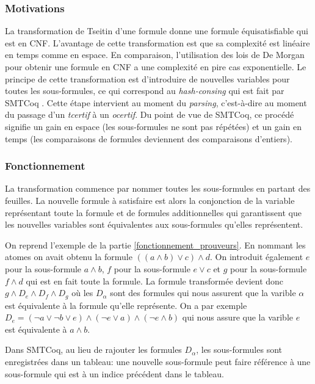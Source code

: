 \documentclass[11pt]{article}
\begin{document}
\subsubsection{Motivations}

La transformation de Tseitin d'une formule donne une formule équisatisfiable qui est en CNF. L'avan\-tage de cette transformation est que sa complexité est linéaire en temps comme en espace. En comparaison, l'utilisation des lois de De Morgan pour obtenir une formule en CNF a une complexité en pire cas exponentielle. Le principe de cette transformation est d'introduire de nouvelles variables pour toutes les sous-formules, ce qui correspond au \textit{hash-consing} qui est fait par SMTCoq \cite{smtcoq_code}. Cette étape intervient au moment du \textit{parsing}, c'est-à-dire au moment du passage d'un \textit{tcertif} à un \textit{ocertif}. Du point de vue de SMTCoq, ce procédé signifie un gain en espace (les sous-formules ne sont pas répétées) et un gain en temps (les comparaisons de formules deviennent des comparaisons d'entiers).


\subsubsection{Fonctionnement}

La transformation commence par nommer toutes les sous-formules en partant des feuilles. La nouvelle formule à satisfaire est alors la conjonction de la variable représentant toute la formule et de formules additionnelles qui garantissent que les nouvelles variables sont équivalentes aux sous-formules qu'elles représentent. \medbreak

On reprend l'exemple de la partie \ref{fonctionnement_prouveurs}. En nommant les atomes on avait obtenu la formule $((a \wedge b) \vee c) \wedge d$. On introduit également $e$ pour la sous-formule $a \wedge b$, $f$ pour la sous-formule $e \vee c$ et $g$ pour la sous-formule $f \wedge d$ qui est en fait toute la formule. La formule transformée devient donc $g \wedge D_e \wedge D_f \wedge D_g$ où les $D_\alpha$ sont des formules qui nous assurent que la varible $\alpha$ est équivalente à la formule qu'elle représente. On a par exemple $D_e = (\neg a \vee \neg b \vee e) \wedge (\neg e \vee a) \wedge (\neg e \wedge b)$ qui nous assure que la varible $e$ est équivalente à $a \wedge b$. \medbreak

Dans SMTCoq, au lieu de rajouter les formules $D_\alpha$, les sous-formules sont enregistrées dans un tableau: une nouvelle sous-formule peut faire référence à une sous-formule qui est à un indice précédent dans le tableau. 
\end{document}
